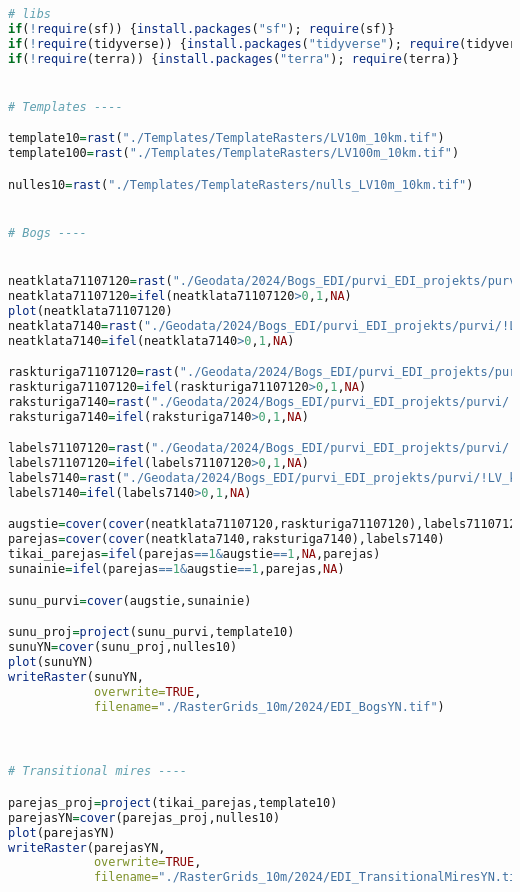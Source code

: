 \documentclass[
]{book}
\begin{document}
\begin{lstlisting}[language=R]
# libs
if(!require(sf)) {install.packages("sf"); require(sf)}
if(!require(tidyverse)) {install.packages("tidyverse"); require(tidyverse)}
if(!require(terra)) {install.packages("terra"); require(terra)}


# Templates ----

template10=rast("./Templates/TemplateRasters/LV10m_10km.tif")
template100=rast("./Templates/TemplateRasters/LV100m_10km.tif")

nulles10=rast("./Templates/TemplateRasters/nulls_LV10m_10km.tif")


# Bogs ----


neatklata71107120=rast("./Geodata/2024/Bogs_EDI/purvi_EDI_projekts/purvi/!LV_kopa_apv1020_30_05_2022/!LV_kopa_apv1020_30_05_2022/Neatklata_purviem_raksturiga_zemsedze_7110_7120.tif")
neatklata71107120=ifel(neatklata71107120>0,1,NA)
plot(neatklata71107120)
neatklata7140=rast("./Geodata/2024/Bogs_EDI/purvi_EDI_projekts/purvi/!LV_kopa_apv1020_30_05_2022/!LV_kopa_apv1020_30_05_2022/Neatklata_purviem_raksturiga_zemsedze_7140.tif")
neatklata7140=ifel(neatklata7140>0,1,NA)

raskturiga71107120=rast("./Geodata/2024/Bogs_EDI/purvi_EDI_projekts/purvi/!LV_kopa_apv1020_30_05_2022/!LV_kopa_apv1020_30_05_2022/Purviem_neraksturiga_zemsedze_7110_7120.tif")
raskturiga71107120=ifel(raskturiga71107120>0,1,NA)
raksturiga7140=rast("./Geodata/2024/Bogs_EDI/purvi_EDI_projekts/purvi/!LV_kopa_apv1020_30_05_2022/!LV_kopa_apv1020_30_05_2022/Purviem_neraksturiga_zemsedze_7140.tif")
raksturiga7140=ifel(raksturiga7140>0,1,NA)

labels71107120=rast("./Geodata/2024/Bogs_EDI/purvi_EDI_projekts/purvi/!LV_kopa_apv1020_30_05_2022/!LV_kopa_apv1020_30_05_2022/latvija_Labels_B7110_7120.tif")
labels71107120=ifel(labels71107120>0,1,NA)
labels7140=rast("./Geodata/2024/Bogs_EDI/purvi_EDI_projekts/purvi/!LV_kopa_apv1020_30_05_2022/!LV_kopa_apv1020_30_05_2022/latvija_Labels_B7140.tif")
labels7140=ifel(labels7140>0,1,NA)

augstie=cover(cover(neatklata71107120,raskturiga71107120),labels71107120)
parejas=cover(cover(neatklata7140,raksturiga7140),labels7140)
tikai_parejas=ifel(parejas==1&augstie==1,NA,parejas)
sunainie=ifel(parejas==1&augstie==1,parejas,NA)

sunu_purvi=cover(augstie,sunainie)

sunu_proj=project(sunu_purvi,template10)
sunuYN=cover(sunu_proj,nulles10)
plot(sunuYN)
writeRaster(sunuYN,
            overwrite=TRUE,
            filename="./RasterGrids_10m/2024/EDI_BogsYN.tif")



# Transitional mires ----

parejas_proj=project(tikai_parejas,template10)
parejasYN=cover(parejas_proj,nulles10)
plot(parejasYN)
writeRaster(parejasYN,
            overwrite=TRUE,
            filename="./RasterGrids_10m/2024/EDI_TransitionalMiresYN.tif")
\end{lstlisting}
\end{document}
